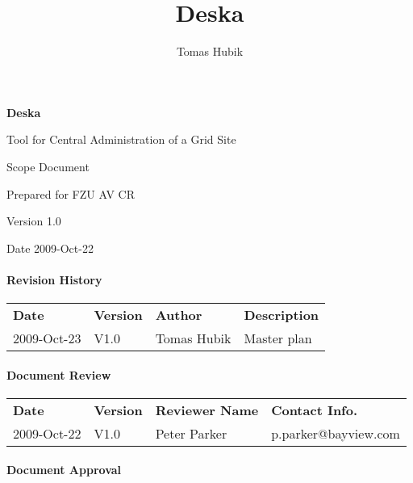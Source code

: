 \documentclass[12pt]{article}
\author{Tomas Hubik}
\title{Deska}
\begin{document}
{\Huge \textbf{Deska}}

\vspace{0.2in}

{\large Tool for Central Administration of a Grid Site}

\vspace{0.5in}

{\large Scope Document}

\vspace{0.2in}

{\large Prepared for FZU AV CR}

\vspace{0.2in}

{\large Version 1.0}

\vspace{0.2in}

{\large Date 2009-Oct-22}

\vspace{0.5in}

\paragraph{Revision History}

\begin{table}[!h]
	\begin{tabular}{l l l l}
		\textbf{Date} & \textbf{Version} & \textbf{Author} & \textbf{Description} \\
		2009-Oct-23 & V1.0 & Tomas Hubik & Master plan \\
	\end{tabular}
	\label{tab:RevisionHistory}
\end{table}


\paragraph{Document Review}

\begin{table}[!h]
	\begin{tabular}{l l l l}
		\textbf{Date} & \textbf{Version} & \textbf{Reviewer Name} & \textbf{Contact Info.} \\
		2009-Oct-22 & V1.0 & Peter Parker & p.parker@bayview.com \\
	\end{tabular}
	\label{tab:DocumentReview}
\end{table}


\paragraph{Document Approval}
\end{document}
